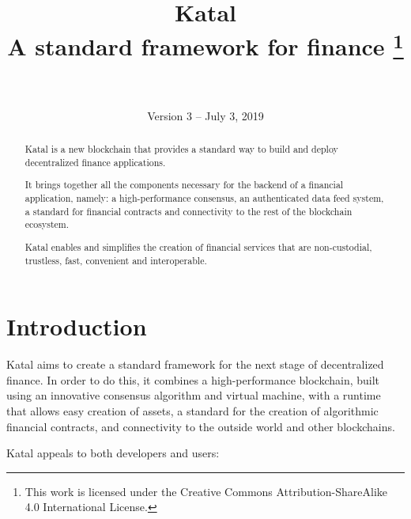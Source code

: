 \documentclass[conference]{IEEEtran}
\begin{document}
\title{Katal\\
	\large A standard framework for finance
	\thanks{This work is licensed under the Creative Commons Attribution-ShareAlike 4.0 International License.}
}

\author{
	\\\\Version 3 -- July 3, 2019
}

\maketitle
\thispagestyle{plain} %
\pagestyle{plain} %

\begin{abstract}
Katal is a new blockchain that provides a standard way to build and deploy decentralized finance applications.

It brings together all the components necessary for the backend of a financial application, namely: a high-performance consensus, an authenticated data feed system, a standard for financial contracts and connectivity to the rest of the blockchain ecosystem.

Katal enables and simplifies the creation of financial services that are non-custodial, trustless, fast, convenient and interoperable.

\end{abstract}

\section{Introduction}
Katal aims to create a standard framework for the next stage of decentralized finance. In order to do this, it combines a high-performance blockchain, built using an innovative consensus algorithm and virtual machine, with a runtime that allows easy creation of assets, a standard for the creation of algorithmic financial contracts, and connectivity to the outside world and other blockchains.

Katal appeals to both developers and users:
\end{document}
